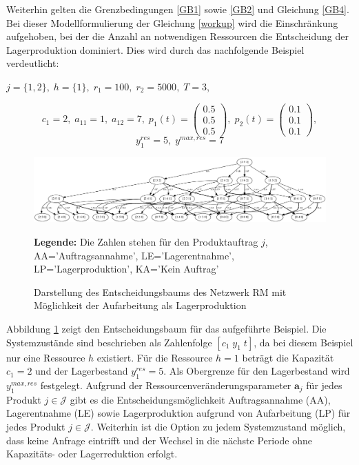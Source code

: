 Weiterhin gelten die Grenzbedingungen \eqref{GB1} sowie \eqref{GB2} und Gleichung \eqref{GB4}. Bei dieser Modellformulierung der Gleichung \eqref{workup} wird die Einschränkung aufgehoben, bei der die Anzahl an notwendigen Ressourcen die Entscheidung der Lagerproduktion dominiert. Dies wird durch das nachfolgende Beispiel verdeutlicht:
\begin{center}
$j = \{1, 2\}, \; h = \{1\}, \; r_{1} = 100, \; r_{2} = 5000, \; T=3$,
\end{center}
\[
    c_{1}=2, \;
    a_{11}=1, \;
     a_{12}=7, \;
     p_{1}(t)=\begin{pmatrix} 0.5\\ 0.5\\ 0.5  \end{pmatrix}, \;
     p_{2}(t)=\begin{pmatrix} 0.1\\ 0.1\\ 0.1  \end{pmatrix},
  \]
  \[
    y_{1}^{res}= 5, \;
    y^{max,res}=7
      \]
\begin{figure}[h!]
  \begin{center}
    \includegraphics[width=130mm]{Bilder/Beispiel5.pdf}
    \caption{Darstellung des Entscheidungsbaums des Netzwerk RM mit Möglichkeit der Aufarbeitung als Lagerproduktion}  \label{B5}
    {\footnotesize \textbf{Legende:} Die Zahlen stehen für den Produktauftrag $j$, AA='Auftragsannahme', LE='Lagerentnahme', LP='Lagerproduktion', KA='Kein Auftrag'} 
  \end{center}
\end{figure}

Abbildung \ref{B5} zeigt den Entscheidungsbaum für das aufgeführte Beispiel. Die Systemzustände sind beschrieben als Zahlenfolge $[c_{1}\; y_{1}\;t]$, da bei diesem Beispiel nur eine Ressource $h$ existiert. Für die Ressource $h=1$ beträgt die Kapazität $c_{1}=2$ und der Lagerbestand $y_{1}^{res}=5$. Als Obergrenze für den Lagerbestand wird $y_{1}^{max,res}$ festgelegt. Aufgrund der Ressourcenveränderungsparameter $\textbf{a}_{j}$ für jedes Produkt $j\in\mathcal{J}$ gibt es die Entscheidungsmöglichkeit Auftragsannahme (AA), Lagerentnahme (LE) sowie Lagerproduktion aufgrund von Aufarbeitung (LP) für jedes Produkt $j\in\mathcal{J}$. Weiterhin ist die Option zu jedem Systemzustand möglich, dass keine Anfrage eintrifft und der Wechsel in die nächste Periode ohne Kapazitäts- oder Lagerreduktion erfolgt.


